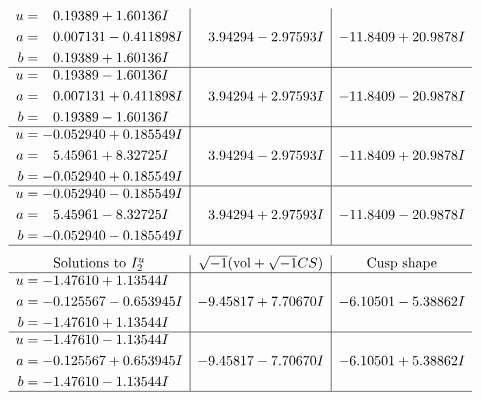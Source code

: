 \documentclass[1p]{elsarticle_modified}
\theoremstyle{definition}
\newcommand{\I}{\sqrt{-1}}
\begin{document}
$$\begin{array}{c|c|c}
\begin{aligned}
u &= \phantom{-}0.19389 + 1.60136 I \\
a &= \phantom{-}0.007131 - 0.411898 I \\
b &= \phantom{-}0.19389 + 1.60136 I\end{aligned}
 & \phantom{-}3.94294 - 2.97593 I & -11.8409 + 20.9878 I \\ \hline\begin{aligned}
u &= \phantom{-}0.19389 - 1.60136 I \\
a &= \phantom{-}0.007131 + 0.411898 I \\
b &= \phantom{-}0.19389 - 1.60136 I\end{aligned}
 & \phantom{-}3.94294 + 2.97593 I & -11.8409 - 20.9878 I \\ \hline\begin{aligned}
u &= -0.052940 + 0.185549 I \\
a &= \phantom{-}5.45961 + 8.32725 I \\
b &= -0.052940 + 0.185549 I\end{aligned}
 & \phantom{-}3.94294 - 2.97593 I & -11.8409 + 20.9878 I \\ \hline\begin{aligned}
u &= -0.052940 - 0.185549 I \\
a &= \phantom{-}5.45961 - 8.32725 I \\
b &= -0.052940 - 0.185549 I\end{aligned}
 & \phantom{-}3.94294 + 2.97593 I & -11.8409 - 20.9878 I\\
 \hline 
 \end{array}$$\newpage$$\begin{array}{c|c|c}  
\text{Solutions to }I^u_{2}& \I (\text{vol} + \sqrt{-1}CS) & \text{Cusp shape}\\
 \hline 
\begin{aligned}
u &= -1.47610 + 1.13544 I \\
a &= -0.125567 - 0.653945 I \\
b &= -1.47610 + 1.13544 I\end{aligned}
 & -9.45817 + 7.70670 I & -6.10501 - 5.38862 I \\ \hline\begin{aligned}
u &= -1.47610 - 1.13544 I \\
a &= -0.125567 + 0.653945 I \\
b &= -1.47610 - 1.13544 I\end{aligned}
 & -9.45817 - 7.70670 I & -6.10501 + 5.38862 I\\
 \hline 
 \end{array}$$\newpage\newpage\renewcommand{\arraystretch}{1}
\end{document}
